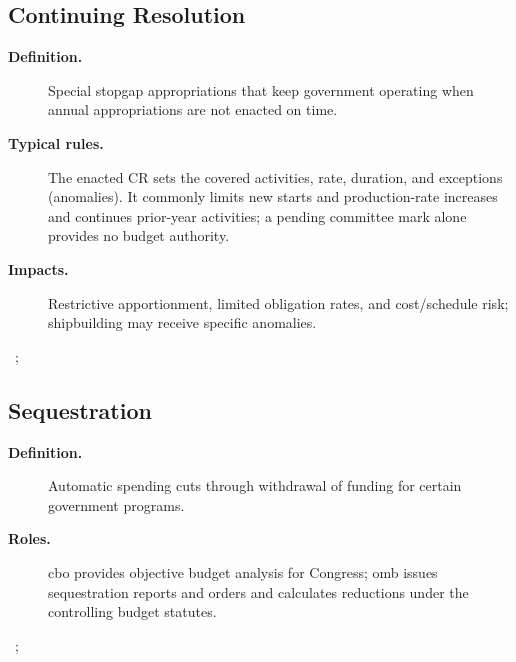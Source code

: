 \documentclass[../main.tex]{subfiles}
\begin{document}

\subsection{Continuing Resolution}
\begin{description}
  \item[\textbf{Definition.}] Special stopgap appropriations that keep government operating when annual appropriations are not enacted on time.
  \item[\textbf{Typical rules.}] The enacted CR sets the covered activities, rate, duration, and exceptions (anomalies). It commonly limits new starts and production-rate increases and continues prior-year activities; a pending committee mark alone provides no budget authority.
  \item[\textbf{Impacts.}] Restrictive apportionment, limited obligation rates, and cost/schedule risk; shipbuilding may receive specific anomalies.
\end{description}
~\autocite{CRS-CR,CRS-R47235-Budget-Process-Timeline,OMB-A11}; 

\subsection{Sequestration}
\begin{description}
  \item[\textbf{Definition.}] Automatic spending cuts through withdrawal of funding for certain government programs.
  \item[\textbf{Roles.}] \ac{cbo} provides objective budget analysis for Congress; \ac{omb} issues sequestration reports and orders and calculates reductions under the controlling budget statutes.
\end{description}
~\autocite{CBO-Introduction-2026,OMB-Sequestration-Reports-2026}; 
\end{document}
